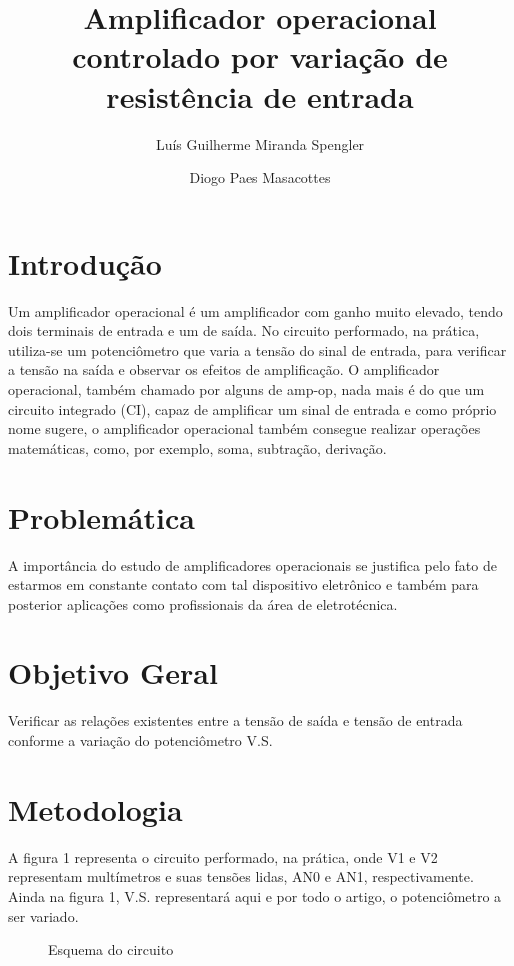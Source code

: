 \documentclass{article}
\title{Amplificador operacional controlado por variação de resistência de entrada}
\date{}
\author[1]{Luís Guilherme Miranda Spengler}
\author[2]{Diogo Paes Masacottes}
\affil[1,2]{Instituto Federal de Educação, Ciência e Tecnologia de Mato Grosso do Sul}
\begin{document}
\maketitle

\section{Introdução}

Um amplificador operacional é um amplificador com ganho muito elevado, tendo dois terminais de entrada e um de saída. No circuito performado, na prática, utiliza-se um potenciômetro que varia a tensão do sinal de entrada, para verificar a tensão na saída e observar os efeitos de amplificação. O amplificador operacional, também chamado por alguns de amp-op, nada mais é do que um circuito integrado (CI), capaz de amplificar um sinal de entrada e como próprio nome sugere, o amplificador operacional também consegue realizar operações matemáticas, como, por exemplo, soma, subtração, derivação.

\section{Problemática}

A importância do estudo de amplificadores operacionais se justifica pelo fato de estarmos em constante contato com tal dispositivo eletrônico e também para posterior aplicações como profissionais da área de eletrotécnica.

\section{Objetivo Geral}

Verificar as relações existentes entre a tensão de saída e tensão de entrada conforme a variação do potenciômetro V.S.

\section{Metodologia}

A figura 1 representa o circuito performado, na prática, onde V1 e V2 representam multímetros e suas tensões lidas, AN0 e AN1, respectivamente. Ainda na figura 1, V.S. representará aqui e por todo o artigo, o potenciômetro a ser variado.

\begin{figure}[h!]
\centering
\def\svgwidth{0.6\columnwidth}

\caption{Esquema do circuito}
\end{figure}
\end{document}
